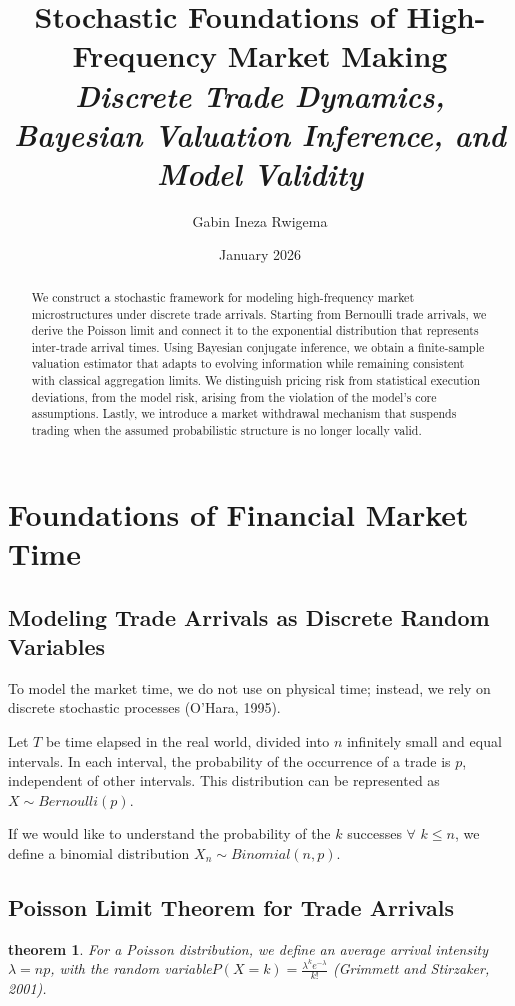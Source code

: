 \documentclass[12pt]{article}
\title{Stochastic Foundations of High-Frequency Market Making\\
 \large{\textit{Discrete Trade Dynamics, Bayesian Valuation Inference, and Model Validity}}}
\author{Gabin Ineza Rwigema}
\date{January 2026}
\theoremstyle{plain}
\newtheorem{theorem}{theorem}[section]
\theoremstyle{definition}
\numberwithin{equation}{section}
\begin{document}
\maketitle
\tableofcontents
\newpage

\begin{abstract}
We construct a stochastic framework for modeling high-frequency market microstructures under discrete trade arrivals. Starting from Bernoulli trade arrivals, we derive the Poisson limit and connect it to the exponential distribution that represents inter-trade arrival times. Using Bayesian conjugate inference, we obtain a finite-sample valuation estimator that adapts to evolving information while remaining consistent with classical aggregation limits. We distinguish pricing risk from statistical execution deviations, from the model risk, arising from the violation of the model's core assumptions. Lastly, we introduce a market withdrawal mechanism that suspends trading when the assumed probabilistic structure is no longer locally valid.
\end{abstract}

\section{Foundations of Financial Market Time}
\subsection{Modeling Trade Arrivals as Discrete Random Variables}
To model the market time, we do not use on physical time; instead, we rely on discrete stochastic processes (O'Hara, 1995).

Let $T$ be time elapsed in the real world, divided into $n$ infinitely small and equal intervals. In each interval, the probability of the occurrence of a trade is $p$, independent of other intervals. This distribution can be represented as $X \sim Bernoulli(p)$. 

If we would like to understand the probability of  the $k$ successes $\forall$ $k \leq n$, we define a binomial distribution $X_n \sim Binomial(n, p)$.

\subsection{Poisson Limit Theorem for Trade Arrivals}
\begin{theorem}
For a Poisson distribution, we define an average arrival intensity $\lambda = np$, with the random variable$ P(X=k) = \frac{\lambda^{k}e^{ -\lambda}}{k!}$ (Grimmett and Stirzaker, 2001).
\end{theorem}
\end{document}
